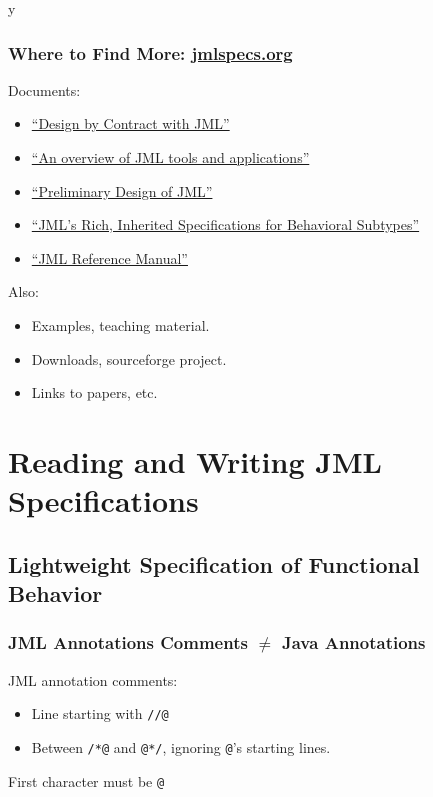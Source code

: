 \if y\MAKEHANDOUTS \documentclass[t,compress,landscape,handout]{beamer}
\begin{document}
\begin{frame}
\frametitle{Where to Find More: \href{http://www.jmlspecs.org}{jmlspecs.org}}

Documents:
\begin{itemize}
\item
\href{ftp://ftp.cs.iastate.edu/pub/leavens/JML/jmldbc.pdf}{``Design by Contract with JML''}

\item
\href{http://dx.doi.org/10.1007/s10009-004-0167-4}{``An overview of JML tools and applications''}

\item
\href{http://doi.acm.org/10.1145/1127878.1127884}{``Preliminary Design of JML''}

\item
\href{http://dx.doi.org/10.1007/11901433}{``JML's Rich, Inherited Specifications for Behavioral Subtypes''}

\item
\href{http://www.jmlspecs.org/jmlrefman/jmlrefman_toc.html}{``JML Reference Manual''}
\end{itemize}

Also:
\begin{itemize}
\item
Examples, teaching material.

\item
Downloads, sourceforge project.

\item
Links to papers, etc.
\end{itemize}

\end{frame}

\section[R/W]{Reading and Writing JML Specifications}

\subsection[Lightweight]{Lightweight Specification of Functional Behavior}

\begin{frame}[fragile]
\frametitle{JML Annotations Comments $\neq$ Java Annotations}

JML annotation comments:
\begin{itemize}
\item
Line starting with \lstinline!//@!

\item
Between \lstinline!/*@! and \lstinline!@*/!,
ignoring \lstinline!@!'s starting lines.
\end{itemize}

First character must be \lstinline!@!

\end{frame}
\end{document}
